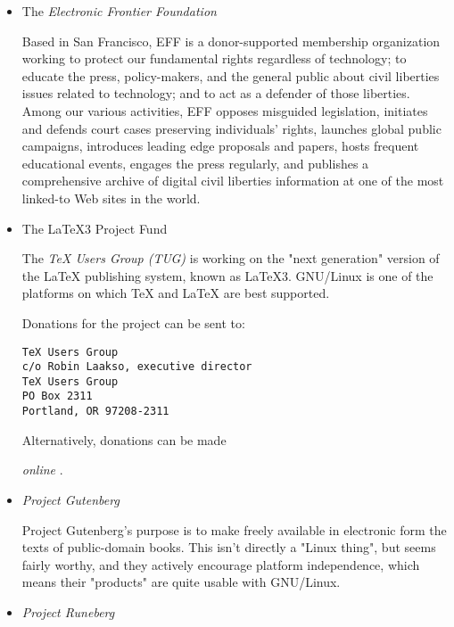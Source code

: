 \begin{itemize}
\item The 
\emph{Electronic Frontier Foundation} \texttt{\adourl}
 

Based in San Francisco, EFF is a donor-supported membership organization
working to protect our fundamental rights regardless of technology; to
educate the press, policy-makers, and the general public about civil
liberties issues related to technology; and to act as a defender of 
those liberties. Among our various activities, EFF opposes misguided
legislation, initiates and defends court cases preserving individuals'
rights, launches global public campaigns, introduces leading edge
proposals and papers, hosts frequent educational events, engages the
press regularly, and publishes a comprehensive archive of digital civil
liberties information at one of the most linked-to Web sites in the
world.



\item The LaTeX3 Project Fund 

 
The 
\emph{TeX Users Group (TUG)} \texttt{\adpurl}
 is
working on the "next generation" version of the LaTeX publishing
system, known as LaTeX3.  GNU/Linux is one of the platforms on which TeX
and LaTeX are best supported.

 Donations for the project can be sent to:
\begin{tscreen}
\begin{verbatim}
TeX Users Group
c/o Robin Laakso, executive director
TeX Users Group
PO Box 2311
Portland, OR 97208-2311
\end{verbatim}
\end{tscreen}


Alternatively, donations can be made 

\emph{online} \texttt{\adqurl}
.



\item  
\emph{Project Gutenberg} \texttt{\adrurl}
 

Project Gutenberg's purpose is to make freely available in electronic
form the texts of public-domain books.  This isn't directly a "Linux
thing", but seems fairly worthy, and they actively encourage platform
independence, which means their "products" are quite usable with GNU/Linux.



\item  
\emph{Project Runeberg} \texttt{\adsurl}
 

\end{itemize}
